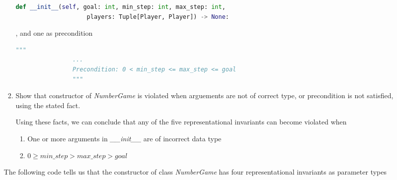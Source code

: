 \documentclass[12pt]{article}
\begin{document}
\begin{enumerate}[1.]
\begin{itemize}
\begin{mdframed}
\begin{enumerate}[1.]
\begin{mdframed}
                \bigskip

                \begin{lstlisting}[language=Python]
                def __init__(self, goal: int, min_step: int, max_step: int,
                    players: Tuple[Player, Player]) -> None:
                \end{lstlisting}

                \bigskip

                , and one as precondition

                \bigskip

                \begin{lstlisting}[language=Python]
                """
                ...
                Precondition: 0 < min_step <= max_step <= goal
                """
                \end{lstlisting}

                \end{mdframed}

                \item Show that constructor of \textit{NumberGame} is violated when arguements
                are not of correct type, or precondition is not satisfied, using the stated fact.

                \begin{mdframed}
                Using these facts, we can conclude that any of the five
                representational invariants can become violated when

                \begin{enumerate}[1.]
                    \item One or more arguments in \textit{\_\_init\_\_} are of incorrect data type
                    \item $0 \geq \textit{min\_step} > \textit{max\_step} > \textit{goal}$
                \end{enumerate}

                \end{mdframed}

            \end{enumerate}

            \begin{mdframed}
            The following code tells us that the constructor of class \textit{NumberGame} has four
            representational invariants as parameter types

            \bigskip


\end{mdframed}
\end{mdframed}
\end{itemize}
\end{enumerate}
\end{document}
